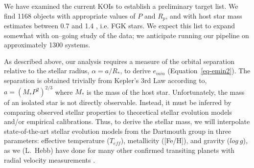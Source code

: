 

\medskip
{\centerline{}}
\smallskip

We have examined the current KOIs to establish a preliminary target
list.  We find 1168 objects with appropriate values of $P$ and $R_p$,
and with host star mass estimates between 0.7 and 1.4 \msun, i.e. FGK
stars.  We expect this list to expand somewhat with on--going study of
the \kepler data; we anticipate running our pipeline on approximately
1300 systems.

As described above, our analysis requires a measure of the orbital
separation relative to the stellar radius, $\alpha = a / R_*$, to
derive $e_{min}$ (Equation~\ref{eq-emin2}).  The separation is
obtained trivially from Kepler's 3rd Law according to, $a = (M_*
P^{2})^{2/3}$ where $M_*$ is the mass of the host star.
Unfortunately, the mass of an isolated star is not directly
observable.  Instead, it must be inferred by comparing observed
stellar properties to theoretical stellar evolution models and/or
empirical calibrations.  Thus, to derive the stellar mass, we will
interpolate state-of-the-art stellar evolution models from the
Dartmouth group \citep{Dotter2008} in three parameters: effective
temperature ($T_{eff}$), metallicity ([Fe/H]), and gravity ($log~g$),
as we (L.~Hebb) have done for many other confirmed transiting planets
with radial velocity measurements \citep[e.g.][]{Hebb2009,Hebb2010}.

